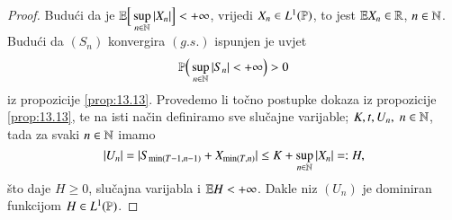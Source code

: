 \begin{proof}
    Budu\' ci da je $\mathbb{E} \Big[\sup\limits_{n \in \mathbb{N}} |X_n| \Big] < +\infty$, vrijedi $X_n \in L^1 (\mathbb{P})$, to jest $\mathbb{E} X_n \in \mathbb{R}$, $n \in \mathbb{N}$.
    Budu\' ci da $(S_n)$ konvergira $(g.s.)$ ispunjen je uvjet
    \begin{equation*}
        \mathbb{P} \Big( \sup\limits_{n \in \mathbb{N}} |S_n| < +\infty \Big) > 0
    \end{equation*}
    iz propozicije \ref{prop:13.13}.
    Provedemo li to\v cno postupke dokaza iz propozicije \ref{prop:13.13}, te na isti na\v cin definiramo sve slu\v cajne varijable; $K, t, U_n, \; n \in \mathbb{N}$, tada za svaki $n \in \mathbb{N}$ imamo
    \begin{equation*}
        |U_n| = |S_{\min (T - 1, n - 1)} + X_{\min (T, n)}| \leq K + \sup\limits_{n \in \mathbb{N}} |X_n| =: H,
    \end{equation*}
    \v sto daje $H \geq 0$, slu\v cajna varijabla i $\mathbb{E} H < + \infty$.
    Dakle niz $(U_n)$ je dominiran funkcijom $H \in L^1 (\mathbb{P})$.


\end{proof}
